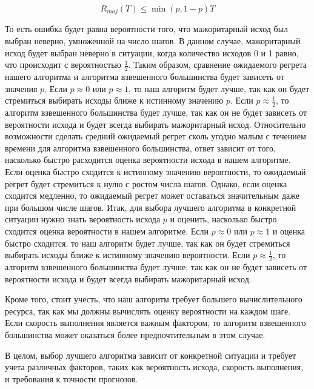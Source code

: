 \documentclass[a4paper,14pt]{extarticle}
\begin{document}
$$R_{maj}(T) \leq \min(p, 1-p)T$$

То есть ошибка будет равна вероятности того, что мажоритарный исход был выбран неверно, умноженной на число шагов. В данном случае, мажоритарный исход будет выбран неверно в ситуации, когда количество исходов 0 и 1 равно, что происходит с вероятностью $\frac{1}{2}$. Таким образом, сравнение ожидаемого регрета нашего алгоритма и алгоритма взвешенного большинства будет зависеть от значения $p$. Если $p\approx 0$ или $p\approx 1$, то наш алгоритм будет лучше, так как он будет стремиться выбирать исходы ближе к истинному значению $p$. Если $p\approx \frac{1}{2}$, то алгоритм взвешенного большинства будет лучше, так как он не будет зависеть от вероятности исхода и будет всегда выбирать мажоритарный исход.
Относительно возможности сделать средний ожидаемый регрет сколь угодно малым с течением времени для алгоритма взвешенного большинства, ответ зависит от того, насколько быстро расходится оценка вероятности исхода в нашем алгоритме. Если оценка быстро сходится к истинному значению вероятности, то ожидаемый регрет будет стремиться к нулю с ростом числа шагов. Однако, если оценка сходится медленно, то ожидаемый регрет может оставаться значительным даже при большом числе шагов.
Итак, для выбора лучшего алгоритма в конкретной ситуации нужно знать вероятность исхода $p$ и оценить, насколько быстро сходится оценка вероятности в нашем алгоритме. Если $p\approx 0$ или $p\approx 1$ и оценка быстро сходится, то наш алгоритм будет лучше, так как он будет стремиться выбирать исходы ближе к истинному значению вероятности. Если $p\approx \frac{1}{2}$, то алгоритм взвешенного большинства будет лучше, так как он не будет зависеть от вероятности исхода и будет всегда выбирать мажоритарный исход.

Кроме того, стоит учесть, что наш алгоритм требует большего вычислительного ресурса, так как мы должны вычислять оценку вероятности на каждом шаге. Если скорость выполнения является важным фактором, то алгоритм взвешенного большинства может оказаться более предпочтительным в этом случае.

В целом, выбор лучшего алгоритма зависит от конкретной ситуации и требует учета различных факторов, таких как вероятность исхода, скорость выполнения, и требования к точности прогнозов.
\end{document}
